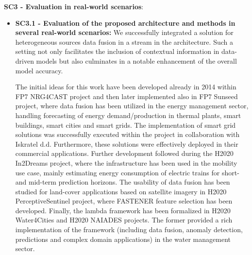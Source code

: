 \noindent \textbf{SC3 - Evaluation in real-world scenarios}: 
\begin{itemize}
    \item \textbf{SC3.1 - Evaluation of the proposed architecture and methods in several real-world scenarios: }
        We successfully integrated a solution for heterogeneous sources data fusion in a stream in the architecture.
        Such a setting not only facilitates the inclusion of contextual information in data-driven models but also culminates in a notable enhancement of the overall model accuracy.

        The initial ideas for this work have been developed already in 2014 within FP7 NRG4CAST project and then later implemented also in FP7 Sunseed project, where data fusion has been utilized in the energy management sector, handling forecasting of energy demand/production in thermal plants, smart buildings, smart cities and smart grids.
        The implementation of smart grid solutions was successfully executed within the project in collaboration with Iskratel d.d. Furthermore, these solutions were effectively deployed in their commercial applications.
        Further development followed during the H2020 In2Dreams project, where the infrastructure has been used in the mobility use case, mainly estimating energy consumption of electric trains for short- and mid-term prediction horizons.
        The usability of data fusion has been studied for land-cover applications based on satellite imagery in H2020 PerceptiveSentinel project, where FASTENER feature selection has been developed.
        Finally, the lambda framework has been formalized in H2020 Water4Cities and H2020 NAIADES projects. 
        The former provided a rich implementation of the framework (including data fusion, anomaly detection, predictions and complex domain applications) in the water management sector.
        

\end{itemize}
